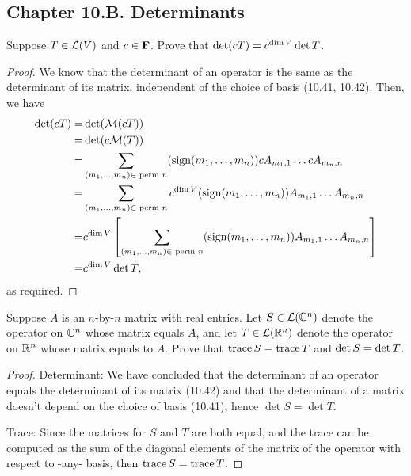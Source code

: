 \subsection*{Chapter 10.B. Determinants}


\begin{exercise}{4}
  Suppose $T\in\mathcal{L}(V)$ and $c\in\mathbf{F}$. Prove that $\operatorname*{det}(cT)=c^{\dim V}\operatorname*{det} T$.
\end{exercise}
\begin{proof}
 We know that the determinant of an operator is the same as the determinant of its matrix, independent of the choice of basis (10.41, 10.42). Then, we have
 \begin{align*}
     \det(cT) =& \det(\mathcal{M}(cT))\\
     =& \det(c\mathcal{M}(T))\\
     =& \sum_{(m_1,\dots,m_n)\in\text{ perm }n}(\text{sign}(m_1,\dots,m_n))cA_{m_1,1}\dots cA_{m_n,n}\\
     =& \sum_{(m_1,\dots,m_n)\in\text{ perm }n}c^{\dim V}(\text{sign}(m_1,\dots,m_n))A_{m_1,1}\dots A_{m_n,n}\\
     =& c^{\dim V}\left[\sum_{(m_1,\dots,m_n)\in\text{ perm }n}(\text{sign}(m_1,\dots,m_n))A_{m_1,1}\dots A_{m_n,n}\right]\\
     =& c^{\dim V}\det T,
 \end{align*}
 as required.
\end{proof}

\begin{exercise}{7}
  Suppose $A$ is an $n$-by-$n$ matrix with real entries. Let $S\in\mathcal{L}(\mathbb{C}^n)$ denote the operator on $\mathbb{C}^n$ whose matrix equals $A$, and let $T\in\mathcal{L}(\mathbb{R}^n)$ denote the operator on $\mathbb{R}^n$ whose matrix equals to $A$. Prove that $\operatorname*{trace} S=\operatorname*{trace} T$ and $\operatorname*{det} S=\operatorname*{det} T$.
\end{exercise}
\begin{proof}
 Determinant: We have concluded that the determinant of an operator equals the determinant of its matrix (10.42) and that the determinant of a matrix doesn't depend on the choice of basis (10.41), hence $\det S=\det T$.

 Trace: Since the matrices for $S$ and $T$ are both equal, and the trace can be computed as the sum of the diagonal elements of the matrix of the operator with respect to -any- basis, then $\operatorname*{trace} S=\operatorname*{trace} T$.
\end{proof}

